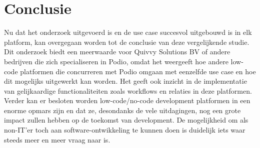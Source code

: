 
\chapter{Conclusie}%
\label{ch:conclusie}


Nu dat het onderzoek uitgevoerd is en de use case succesvol uitgebouwd is in elk platform, kan overgegaan worden tot de conclusie van deze vergelijkende studie. \\

Dit onderzoek biedt een meerwaarde voor Quivvy Solutions BV of andere bedrijven die zich specialiseren in Podio, omdat het weergeeft hoe andere low-code platformen die concurreren met Podio omgaan met eenzelfde use case en hoe dit mogelijks uitgewerkt kan worden. Het geeft ook inzicht in de implementatie van gelijkaardige functionaliteiten zoals workflows en relaties in deze platformen. \\

Verder kan er besloten worden low-code/no-code development platformen in een enorme opmars zijn en dat ze, desondanks de vele uitdagingen, nog een grote impact zullen hebben op de toekomst van development. De mogelijkheid om als non-IT'er toch aan software-ontwikkeling te kunnen doen is duidelijk iets waar steeds meer en meer vraag naar is. \\


